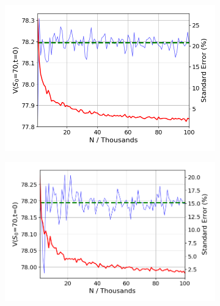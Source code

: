 \documentclass{article}
\begin{document}
\begin{figure}[!h]
\begin{minipage}{.5\textwidth}
  \centering
  \begin{subfigure}{\textwidth}
      \includegraphics[width=\linewidth]{confidence_70_normal.png}
      \label{fig:confidence1}
  \end{subfigure}
  \medskip
  \begin{subfigure}{\textwidth}
      \includegraphics[width=\linewidth]{confidence_70_antithetic.png}
      \label{fig:confidence2}
  \end{subfigure}
  \medskip
  \begin{subfigure}{\textwidth}

\end{subfigure}
\end{minipage}
\end{figure}
\end{document}
